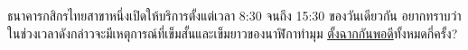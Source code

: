 \question{}

ธนาคารกสิกรไทยสาขาหนึ่งเปิดให้บริการตั้งแต่เวลา 8:30 จนถึง 15:30 ของวันเดียวกัน\;
อยากทราบว่าในช่วงเวลาดังกล่าวจะมีเหตุการณ์ที่เข็มสั้นและเข็มยาวของนาฬิกาทำมุม%
\uline{ตั้งฉากกันพอดี}ทั้งหมดกี่ครั้ง?\hrsp%
